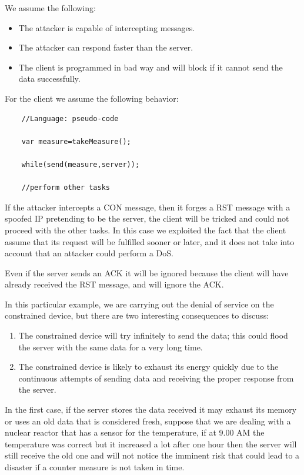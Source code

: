 	We assume the following:
	\begin{itemize}
		\item The attacker is capable of intercepting messages.
		\item The attacker can respond faster than the server.
		\item The client is programmed in bad way and will block if it cannot send the data successfully.
	\end{itemize}

	For the client we assume the following behavior:
	\begin{lstlisting}
	//Language: pseudo-code
	
	var measure=takeMeasure();
	
	while(send(measure,server));
	
	//perform other tasks
	\end{lstlisting}
	
	If the attacker intercepts a CON message, then it forges a RST message with a spoofed IP pretending to be the server, the client will be tricked and could not proceed with the other tasks.\newline
	In this case we exploited the fact that the client assume that its request will be fulfilled sooner or later, and it does not take into account that an attacker could perform a DoS.\newline
	
	Even if the server sends an ACK it will be ignored because the client will have already received the RST message, and will ignore the ACK.\newline
	
	In this particular example, we are carrying out the denial of service on the constrained device, but there are two interesting consequences to discuss:
	\begin{enumerate}
		\item The constrained device will try infinitely to send the data; this could flood the server with the same data for a very long time.
		\item The constrained device is likely to exhaust its energy quickly due to the continuous attempts of sending data and receiving the proper response from the server.
	\end{enumerate}

	In the first case, if the server stores the data received it may exhaust its memory or uses an old data that is considered fresh, suppose that we are dealing with a nuclear reactor that has a sensor for the temperature, if at 9.00 AM the temperature was correct but it increased a lot after one hour then the server will still receive the old one and will not notice the imminent risk that could lead to a disaster if a counter measure is not taken in time.\newline
	
